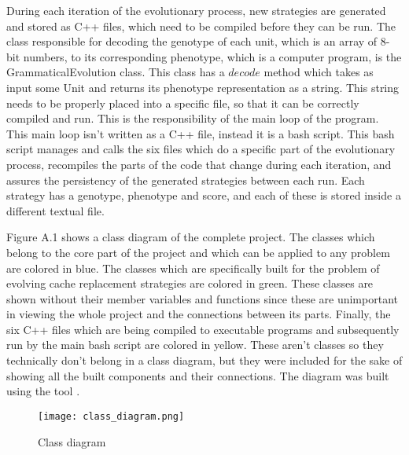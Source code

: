 During each iteration of the evolutionary process, new strategies are generated and stored as C++ files, which need to be compiled before they can be run. The class responsible for decoding the genotype of each unit, which is an array of 8-bit numbers, to its corresponding phenotype, which is a computer program, is the GrammaticalEvolution class. This class has a $decode$ method which takes as input some Unit and returns its phenotype representation as a string. This string needs to be properly placed into a specific file, so that it can be correctly compiled and run. This is the responsibility of the main loop of the program. This main loop isn't written as a C++ file, instead it is a bash script. This bash script manages and calls the six files which do a specific part of the evolutionary process, recompiles the parts of the code that change during each iteration, and assures the persistency of the generated strategies between each run. Each strategy has a genotype, phenotype and score, and each of these is stored inside a different textual file.

Figure A.1 shows a class diagram of the complete project. The classes which belong to the core part of the project and which can be applied to any problem are colored in blue. The classes which are specifically built for the problem of evolving cache replacement strategies are colored in green. These classes are shown without their member variables and functions since these are unimportant in viewing the whole project and the connections between its parts. Finally, the six C++ files which are being compiled to executable programs and subsequently run by the main bash script are colored in yellow. These aren't classes so they technically don't belong in a class diagram, but they were included for the sake of showing all the built components and their connections. The diagram was built using the tool \citep{diagrams}.

\begin{figure}[H]
	\centering
	\texttt{[image: class\_diagram.png]}
	\caption{Class diagram}
\end{figure}